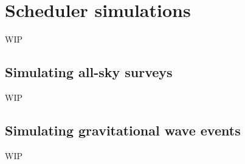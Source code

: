 
\newpage
\section{Scheduler simulations}
\label{sec:simulations}
\begin{colsection}


\begin{colsection}

WIP

\end{colsection}


\subsection{Simulating all-sky surveys}
\label{sec:survey_simulations}
\begin{colsection}

WIP

\end{colsection}


\subsection{Simulating gravitational wave events}
\label{sec:gw_simulations}
\begin{colsection}

WIP

\end{colsection}


\end{colsection}


\newpage
